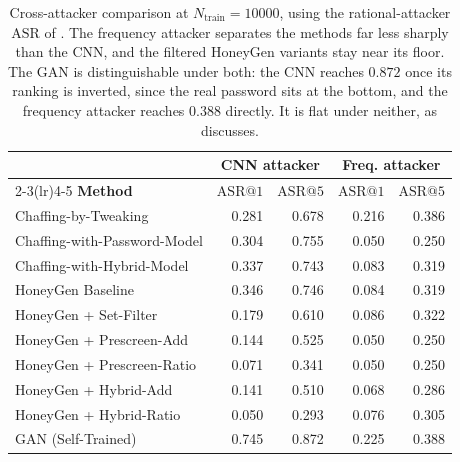 \begin{table}[t]
  \centering
  \begin{tabular}{lrrrr}
    \toprule
    & \multicolumn{2}{c}{\textbf{CNN attacker}} & \multicolumn{2}{c}{\textbf{Freq. attacker}} \\
    \cmidrule(lr){2-3}\cmidrule(lr){4-5}
    \textbf{Method} & $\mathrm{ASR}@1$ & $\mathrm{ASR}@5$ & $\mathrm{ASR}@1$ & $\mathrm{ASR}@5$ \\
    \midrule
    Chaffing-by-Tweaking & 0.281 & 0.678 & 0.216 & 0.386 \\
    Chaffing-with-Password-Model & 0.304 & 0.755 & 0.050 & 0.250 \\
    Chaffing-with-Hybrid-Model & 0.337 & 0.743 & 0.083 & 0.319 \\
    HoneyGen Baseline & 0.346 & 0.746 & 0.084 & 0.319 \\
    HoneyGen + Set-Filter & 0.179 & 0.610 & 0.086 & 0.322 \\
    HoneyGen + Prescreen-Add & 0.144 & 0.525 & 0.050 & 0.250 \\
    HoneyGen + Prescreen-Ratio & 0.071 & 0.341 & 0.050 & 0.250 \\
    HoneyGen + Hybrid-Add & 0.141 & 0.510 & 0.068 & 0.286 \\
    HoneyGen + Hybrid-Ratio & 0.050 & 0.293 & 0.076 & 0.305 \\
        GAN (Self-Trained) & 0.745 & 0.872 & 0.225 & 0.388 \\
    \bottomrule
  \end{tabular}
    \caption{Cross-attacker comparison at $N_{\text{train}}=10000$, using
  the rational-attacker $\mathrm{ASR}$ of . The
  frequency attacker separates the methods far less sharply than the
  CNN, and the filtered HoneyGen variants stay near its floor. The GAN
  is distinguishable under both: the CNN reaches $0.872$ once its
  ranking is inverted, since the real password sits at the bottom, and
  the frequency attacker reaches $0.388$ directly. It is flat under
  neither, as  discusses.}
  \label{tab:crossatt}
\end{table}

